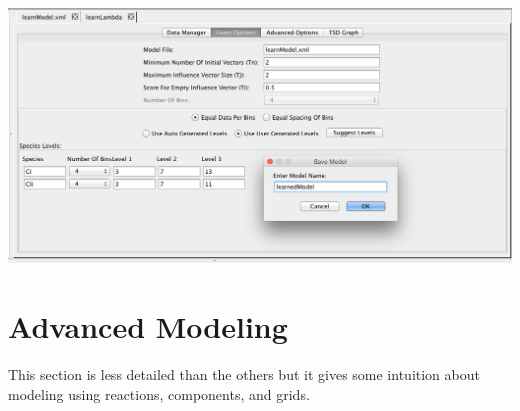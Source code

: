 \documentclass[titlepage,11pt]{article}
\begin{document}
\begin{center}
\includegraphics[width=160mm]{screenshots/learn}
\end{center}

\section{Advanced Modeling}

This section is less detailed than the others but it gives some intuition about modeling using reactions, components, and grids.  

\end{document}
